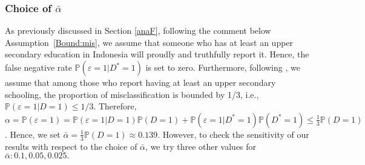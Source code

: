 \documentclass[11pt,reqno]{amsart}
\theoremstyle{plain}
\numberwithin{equation}{section}
\begin{document}
\subsubsection*{Choice of $\bar{\alpha}$} As previously discussed in Section \ref{anaF}, following the comment below Assumption~\ref{Bound:mis}, we assume that someone who has at least an upper secondary education in Indonesia will proudly and truthfully report it. Hence, the false negative rate $\mathbb P(\varepsilon=1\vert D^*=1)$ is set to zero. Furthermore, following \cite{Black_etal2003}, we assume that among those who report having at least an upper secondary schooling, the proportion of misclassification is bounded by 1/3, i.e., $\mathbb P(\varepsilon=1\vert D=1) \leq 1/3$. Therefore, $\alpha=\mathbb P(\varepsilon=1)=\mathbb P(\varepsilon=1\vert D=1)\mathbb P(D=1)+\mathbb P(\varepsilon=1\vert D^*=1) \mathbb P(D^*=1) \leq \frac{1}{3}\mathbb P(D=1)$. Hence, we set $\bar{\alpha}=\frac{1}{3}\mathbb P(D=1) \approx 0.139$. However, to check the sensitivity of our results with respect to the choice of $\bar{\alpha}$, we try three other values for $\bar{\alpha}: 0.1, 0.05, 0.025.$
\end{document}
